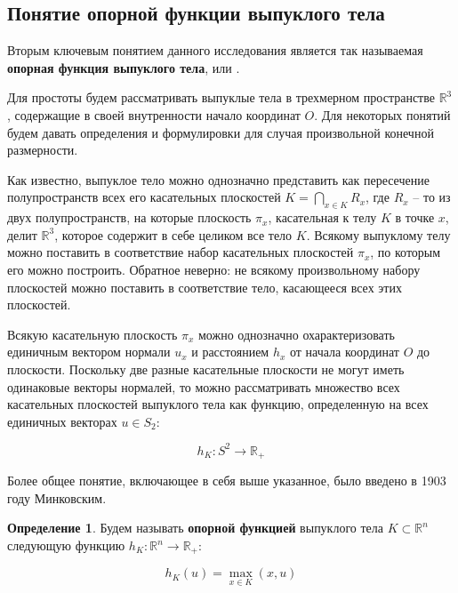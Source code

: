 \documentclass[a4paper, 12pt, titlepage]{article}
\theoremstyle{definition}
\newtheorem{SmartDefinition}{Определение}
\theoremstyle{plain}
\theoremstyle{plain}
\begin{document}
\subsection{Понятие опорной функции выпуклого тела}

Вторым ключевым понятием данного исследования является так называемая
\textbf{опорная функция выпуклого тела}, или .

Для простоты будем рассматривать выпуклые тела в трехмерном пространстве
$\mathbb{R}^{3}$, содержащие в своей внутренности начало координат $O$.
Для некоторых понятий будем давать определения и формулировки для случая
произвольной конечной размерности.

Как известно, выпуклое тело можно однозначно представить как пересечение 
полупространств всех его касательных плоскостей 
$K = \bigcap \limits_{x \in K} R_{x}$, где $R_{x}$ -- то из двух
полупространств, на которые плоскость $\pi_{x}$, касательная к телу $K$ в
точке $x$, делит $\mathbb{R}^{3}$, которое содержит в себе целиком все тело
$K$. Всякому выпуклому телу можно поставить в соответствие набор касательных 
плоскостей $\pi_{x}$, по которым его можно построить. Обратное неверно: не
всякому произвольному набору плоскостей можно поставить в соответствие тело,
касающееся всех этих плоскостей.

Всякую касательную плоскость $\pi_{x}$ можно однозначно охарактеризовать
единичным вектором нормали $u_{x}$ и расстоянием $h_{x}$ от начала координат 
$O$ до плоскости. Поскольку две разные касательные плоскости не могут иметь
одинаковые векторы нормалей, то можно рассматривать множество всех касательных
плоскостей выпуклого тела как функцию, определенную на всех единичных векторах
$u \in S_{2}$:

\begin{equation}h_{K}: S^{2} \to \mathbb{R}_{+}\end{equation}

Более общее понятие, включающее в себя выше указанное, было введено в 1903 году
Минковским.

\begin{SmartDefinition}
 \label{def:support-function}
 Будем называть \textbf{опорной функцией} выпуклого тела
 $K \subset \mathbb{R}^{n}$ следующую функцию
 $h_{K}: \mathbb{R}^{n} \to \mathbb{R}_{+}$:

 \begin{equation}h_{K}(u) = \max \limits_{x \in K}(x, u)\end{equation}
\end{SmartDefinition}
\end{document}
